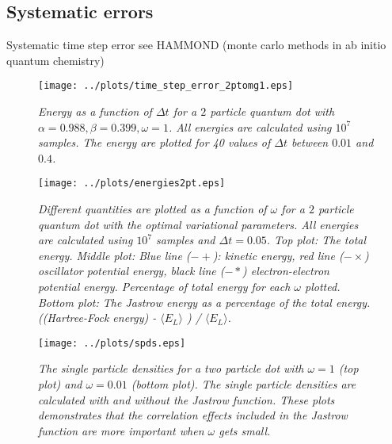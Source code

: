 \documentclass[a4paper,10pt,twocolumn]{article} %
\newcommand{\expec}[1]{\langle{}{#1}\rangle{}}
\begin{document}
\subsection{Systematic errors}

Systematic time step error see HAMMOND (monte carlo methods in ab initio quantum chemistry)

\begin{figure}[h!]
\begin{center}
\caption{{\it%
			Energy as a function of $\Delta t$ for a $2$ particle quantum dot with $\alpha=0.988,\beta=0.399,\omega=1$. All energies are calculated using $10^7$ samples.
			The energy are plotted for 40 values of $\Delta t$ between $0.01$ and $0.4$. 
		}}
		\label{fig:ef}
	\texttt{[image: ../plots/time\_step\_error\_2ptomg1.eps]}
\end{center}
\end{figure}

\begin{figure}[h!]
\begin{center}
\caption{{\it%
			Different quantities are plotted as a function of $\omega$ for a $2$ particle quantum dot with the optimal variational parameters. 
			All energies are calculated using $10^7$ samples and $\Delta t = 0.05$.
			Top plot: The total energy.
			Middle plot:
			Blue line ($-+$): kinetic energy, red line ($-\times$) oscillator potential energy, black line ($-*$) electron-electron potential energy.
			Percentage of total energy for each $\omega$ plotted.
			Bottom plot: The Jastrow energy as a percentage of the total energy. ((Hartree-Fock energy) - $\expec{E_L}$ ) / $\expec{E_L}$. 
		}}
		\label{figes}
	\texttt{[image: ../plots/energies2pt.eps]}
\end{center}
\end{figure}

\begin{figure}[h!]
\begin{center}
\caption{{\it%
		The single particle densities for a two particle dot with $\omega=1$ (top plot) and $\omega=0.01$ (bottom plot). 
		The single particle densities are calculated with and without the Jastrow function. These plots demonstrates that the correlation effects 
		included in the Jastrow function are more important when $\omega$ gets small.
		}}
		\label{fig:ef}
\vspace{.1cm}
	\texttt{[image: ../plots/spds.eps]}
\end{center}
\end{figure}
\end{document}
